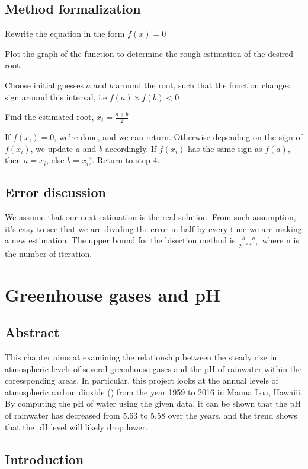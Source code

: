 \documentclass{book}
\begin{document}
	\section{Method formalization}
	\begin{steps}
		\item Rewrite the equation in the form ${f(x) = 0}$
		\item Plot the graph of the function to determine the rough estimation of the desired root.
		\item Choose initial guesses ${a}$ and ${b}$ around the root, such that the function changes sign around this interval, i.e ${f(a) \times f(b)<0}$
		\item Find the estimated root, ${x_i = \frac{a + b}{2}}$
		\item If ${f(x_i) = 0}$, we're done, and we can return. Otherwise depending on the sign of ${f(x_i)}$, we update ${a}$ and ${b}$ accordingly. If ${f(x_i)}$ has the same sign as ${f(a)}$, then ${a = x_i}$, else ${b = x_i)}$. Return to step 4.
	\end{steps}
	\section{Error discussion}
	We assume that our next estimation is the real solution. From such assumption, it's easy to see that we are dividing the error in half by every time we are making a new estimation. The upper bound for the bisection method is ${\frac{b - a}{2^(n+1)}}$ where n is the number of iteration.
	\chapter{Greenhouse gases and pH}
	\section{Abstract}
	This chapter aims at examining the relationship between the steady 	rise in atmospheric levels of several greenhouse gases and the pH of rainwater within the coressponding areas. In particular, this project looks at the annual levels of atmospheric carbon dioxide () from the year 1959 to 2016 in Mauna Loa, Hawaiii. By computing the pH of water using the given data, it can be shown that the pH of rainwater has decreased from 5.63 to 5.58 over the years, and the trend shows that the pH level will likely drop lower.
	
	\section{Introduction}
	
\end{document}
